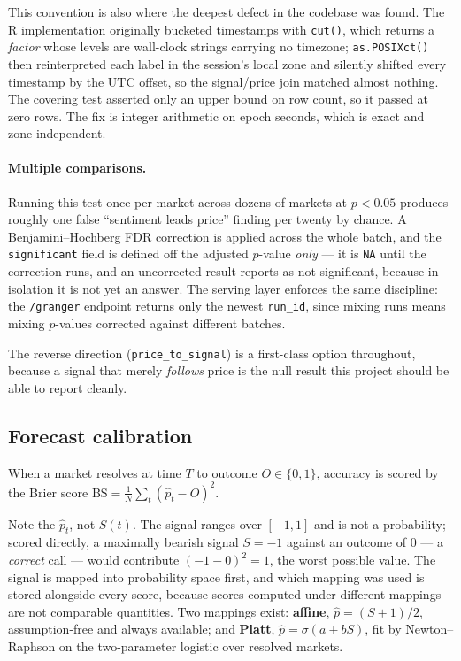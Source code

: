 \documentclass[11pt]{article}
\newcommand{\code}[1]{\texttt{\small #1}}
\begin{document}
This convention is also where the deepest defect in the codebase was found. The
R implementation originally bucketed timestamps with \code{cut()}, which returns
a \emph{factor} whose levels are wall-clock strings carrying no timezone;
\code{as.POSIXct()} then reinterpreted each label in the session's local zone and
silently shifted every timestamp by the UTC offset, so the signal/price join
matched almost nothing. The covering test asserted only an upper bound on row
count, so it passed at zero rows. The fix is integer arithmetic on epoch
seconds, which is exact and zone-independent.

\paragraph{Multiple comparisons.} Running this test once per market across dozens
of markets at $p < 0.05$ produces roughly one false ``sentiment leads price''
finding per twenty by chance. A Benjamini--Hochberg FDR correction is applied
across the whole batch, and the \code{significant} field is defined off the
adjusted $p$-value \emph{only} --- it is \code{NA} until the correction runs, and
an uncorrected result reports as not significant, because in isolation it is not
yet an answer. The serving layer enforces the same discipline: the
\code{/granger} endpoint returns only the newest \code{run\_id}, since mixing
runs means mixing $p$-values corrected against different batches.

The reverse direction (\code{price\_to\_signal}) is a first-class option
throughout, because a signal that merely \emph{follows} price is the null result
this project should be able to report cleanly.

\subsection{Forecast calibration}

When a market resolves at time $T$ to outcome $O \in \{0,1\}$, accuracy is
scored by the Brier score $\text{BS} = \frac{1}{N}\sum_t (\hat{p}_t - O)^2$.

Note the $\hat{p}_t$, not $S(t)$. The signal ranges over $[-1,1]$ and is not a
probability; scored directly, a maximally bearish signal $S = -1$ against an
outcome of $0$ --- a \emph{correct} call --- would contribute $(-1-0)^2 = 1$,
the worst possible value. The signal is mapped into probability space first, and
which mapping was used is stored alongside every score, because scores computed
under different mappings are not comparable quantities. Two mappings exist:
\textbf{affine}, $\hat{p} = (S+1)/2$, assumption-free and always available; and
\textbf{Platt}, $\hat{p} = \sigma(a + bS)$, fit by Newton--Raphson on the
two-parameter logistic over resolved markets.
\end{document}
